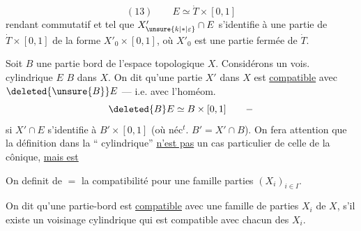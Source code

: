 \[
(13)\qquad E\simeq\dot T\times[0,1]
\]
rendant commutatif
et tel que $X'_{\unsure{k|*|\varepsilon}}\cap E$ s'identifie à une partie
de $\dot T\times[0,1]$ de la forme $X'_0\times[0,1]$, où $X'_0$
est une partie fermée de $\dot T$.

Soit $B$ une partie bord  de l'espace
topologique $X$. Considérons un vois.
cylindrique $E$  $B$ dans $X$. On
dit qu'une partie  $X'$ dans $X$ est \uline{compatible}
avec $\deleted{\unsure{B}}E$ --- i.e. avec l'homéom.
\[
\deleted{B}E\simeq B\times[0,1]\qquad -
\]
si $X'\cap E$ s'identifie à $B'\times[0,1]$
(où néc$^t$.  $B'=X'\cap B$).
On fera attention que la définition dans la
``
 cylindrique'' \uline{n'est pas} un cas
particulier de celle de la 
cônique, \uline{mais est}

On definit de $=$ la compatibilité pour
une famille   parties $(X_i)_{i\in I}$.

On dit qu'une partie-bord  est \uline{compatible} avec
une famille de parties $X_i$ de $X$, s'il
existe un voisinage cylindrique qui est
compatible  avec chacun des $X_i$.

